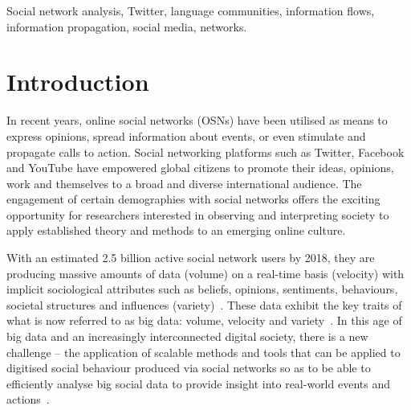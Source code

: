 \documentclass[conference]{IEEEtran}
\begin{document}
%

\begin{IEEEkeywords}
Social network analysis, Twitter, language communities, information
flows, information propagation, social media, networks.
\end{IEEEkeywords}


\section{Introduction}\label{intro}

In recent years, online social networks (OSNs) have been utilised as
means to express opinions, spread information about events, or even
stimulate and propagate calls to action. Social networking platforms
such as Twitter, Facebook and YouTube have empowered global citizens
to promote their ideas, opinions, work and themselves to a broad and
diverse international audience. The engagement of certain demographies
with social networks offers the exciting opportunity for
researchers interested in observing and interpreting society to apply
established theory and methods to an emerging online culture.

With an estimated 2.5 billion active social network users by 2018,
they are producing massive amounts of data (volume) on a real-time
basis (velocity) with implicit sociological attributes such as
beliefs, opinions, sentiments, behaviours, societal structures and
influences (variety)~\cite{burnap-et-al:2015}. These data exhibit the
key traits of what is now referred to as big data: volume, velocity
and variety~\cite{postsm:2014}. In this age of big data and an
increasingly interconnected digital society, there is a new challenge
-- the application of scalable methods and tools that can be applied
to digitised social behaviour produced via social networks so as to be
able to efficiently analyse big social data to provide insight into
real-world events and
actions~\cite{lazer-et-al:2009,burnap-et-al:2015}.

\end{document}
